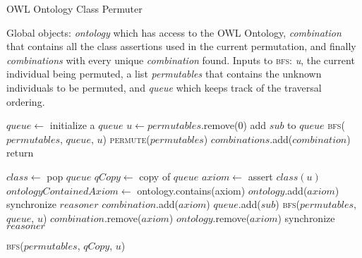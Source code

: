 \documentclass{article}
\begin{document}
  \begin{algorithm}
    \caption{OWL Ontology Class Permuter}
    Global objects:
    \emph{ontology} which has access to the OWL Ontology,
    \emph{combination} that contains all the class assertions
    used in the current permutation, and finally \emph{combinations} with every unique \emph{combination} found.
    \newline Inputs to \textsc{bfs}:
    \emph{u}, the current individual being permuted,
    a list \emph{permutables} that contains the unknown individuals to be permuted, and
    \emph{queue} which keeps track of the traversal ordering.
    \begin{algorithmic}[0]

      \State $queue \leftarrow$ initialize a $queue$
      \State $u \leftarrow permutables$.remove(0)
      \State add $sub$ to $queue$
      \EndFor
      \State \textsc{bfs}($permutables$, $queue$, $u$)
      \State
      \EndProcedure
      \State \textsc{permute}($permutables$)
      \State $combinations$.add($combination$)
      \EndIf
      \State return
      \EndIf

      \State
      \State $class \leftarrow$ pop $queue$
      \State $qCopy \leftarrow$ copy of $queue$
      \State $axiom \leftarrow$ assert $class(u)$
      \State $ontologyContainedAxiom \leftarrow$ ontology.contains(axiom)
      \State
      \State $ontology$.add($axiom$)
      \State synchronize $reasoner$
      \State
      \EndIf
      \State $combination$.add($axiom$)
      \State $queue$.add($sub$)
      \EndIf
      \EndFor
      \State
      \State \textsc{bfs}($permutables$, $queue$, $u$)
      \State $combination$.remove($axiom$)
      \EndIf
      \State
      \State $ontology$.remove($axiom$)
      \State synchronize $reasoner$
      \EndIf

      \State \textsc{bfs}($permutables$, $qCopy$, $u$)

      \EndProcedure

    \end{algorithmic}
  \end{algorithm}
\end{document}
